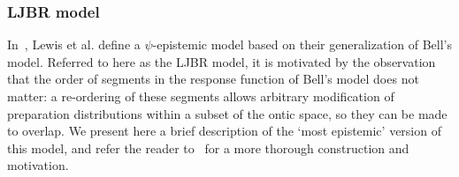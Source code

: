 \documentclass[%
 reprint, onecolumn, 12pt,
superscriptaddress,
nofootinbib,
 prx, 
]{quantumarticle}
\begin{document}
\subsubsection{LJBR model}
\label{sec:ljbr-model}

In~\cite{LewisDistinctQuantumStates2012}, Lewis et al. define a
$\psi$-epistemic model based on their generalization of Bell's model.
Referred to here as the LJBR model, it is motivated by the observation
that the order of segments in the response function of Bell's model
does not matter: a re-ordering of these segments allows arbitrary
modification of preparation distributions within a subset of the ontic
space, so they can be made to overlap. We present here a brief
description of the `most epistemic' version of this model, and refer
the reader to~\cite{LewisDistinctQuantumStates2012} for a more
thorough construction and motivation.
\end{document}
